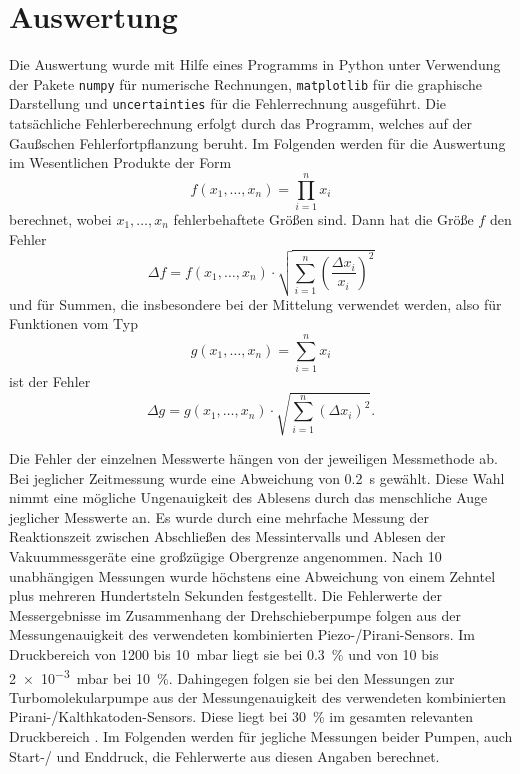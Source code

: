 \section{Auswertung}
\label{sec:Auswertung}

Die Auswertung wurde mit Hilfe eines Programms in Python unter Verwendung der Pakete \texttt{numpy}\cite{numpy} für numerische Rechnungen,
 \texttt{matplotlib}\cite{matplotlib} für die graphische Darstellung und \texttt{uncertainties}\cite{uncertainties} für die Fehlerrechnung ausgeführt.
Die tatsächliche Fehlerberechnung erfolgt durch das Programm, welches auf der Gaußschen Fehlerfortpflanzung beruht.
Im Folgenden werden für die Auswertung im Wesentlichen Produkte der Form
\begin{equation*}
  f(x_1,\ldots,x_n) = \prod_{i=1}^n x_i
\end{equation*}
berechnet, wobei $x_1,\ldots,x_n$ fehlerbehaftete Größen sind.
Dann hat die Größe $f$ den Fehler
\begin{equation*}
  \Delta f = f(x_1,\ldots,x_n) \cdot \sqrt{\sum_{i=1}^n \left(\frac{\Delta x_i}{x_i}\right)^2}
\end{equation*}
und für Summen, die insbesondere bei der Mittelung verwendet werden, also für Funktionen vom Typ
\begin{equation*}
  g(x_1,\ldots,x_n) = \sum_{i=1}^n x_i
\end{equation*}
ist der Fehler
\begin{equation}
  \Delta g = g(x_1,\ldots,x_n) \cdot \sqrt{\sum_{i=1}^n \left(\Delta x_i\right)^2}.
  \label{eq:fehlerDesMittelwertes}
\end{equation}

Die Fehler der einzelnen Messwerte hängen von der jeweiligen Messmethode ab.
Bei jeglicher Zeitmessung wurde eine Abweichung von \qty{0.2}{\second} gewählt.
Diese Wahl nimmt eine mögliche Ungenauigkeit des Ablesens durch das menschliche Auge jeglicher Messwerte an.
Es wurde durch eine mehrfache Messung der Reaktionszeit zwischen Abschließen des Messintervalls und
Ablesen der Vakuummessgeräte eine großzügige Obergrenze angenommen. Nach 10 unabhängigen Messungen wurde höchstens eine Abweichung von einem Zehntel plus mehreren Hundertsteln Sekunden festgestellt.
Die Fehlerwerte der Messergebnisse im Zusammenhang der Drehschieberpumpe folgen aus der Messungenauigkeit des verwendeten kombinierten Piezo-/Pirani-Sensors.
Im Druckbereich von \num{1200} bis \qty{10}{\milli\bar} liegt sie bei \qty{0.3}{\percent} und von \num{10} bis \qty{2e-3}{\milli\bar} bei \qty{10}{\percent}\cite{sample}.
Dahingegen folgen sie bei den Messungen zur Turbomolekularpumpe aus der Messungenauigkeit des verwendeten kombinierten Pirani-/Kalthkatoden-Sensors.
Diese liegt bei \qty{30}{\percent} im gesamten relevanten Druckbereich \cite{sample}.
Im Folgenden werden für jegliche Messungen beider Pumpen, auch Start-/ und Enddruck, die Fehlerwerte aus diesen Angaben berechnet.

